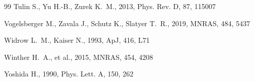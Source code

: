 \documentclass[11pt,a4paper]{article}
\begin{document}
\begin{thebibliography}{99}
Tulin S., Yu H.-B., Zurek K.~M., 2013, Phys. Rev. D, 87, 115007

Vogelsberger M., Zavala J., Schutz K., Slatyer T.~R., 2019, MNRAS, 484, 5437

Widrow L.~M., Kaiser N., 1993, ApJ, 416, L71

Winther H.~A., et al., 2015, MNRAS, 454, 4208

Yoshida H., 1990, Phys. Lett. A, 150, 262

\end{thebibliography}
\end{document}
